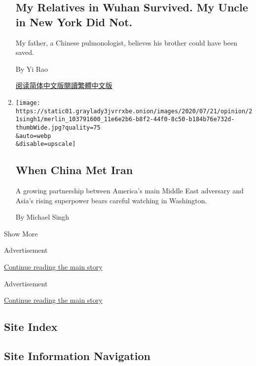 \begin{enumerate}
{  \subsection{My Relatives in Wuhan Survived. My Uncle in New York Did
  Not.}\label{my-relatives-in-wuhan-survived-my-uncle-in-new-york-did-not}}

  My father, a Chinese pulmonologist, believes his brother could have
  been saved.

  By Yi Rao

  \href{https://cn.nytimes3xbfgragh.onion/opinion/20200723/coronavirus-china-us/}{阅读简体中文版}\href{https://cn.nytimes3xbfgragh.onion/opinion/20200723/coronavirus-china-us/zh-hant/}{閱讀繁體中文版}
\item
  \href{/2020/07/21/opinion/china-iran.html}{}

  \texttt{[image: https://static01.graylady3jvrrxbe.onion/images/2020/07/21/opinion/21singh1/merlin\_103791600\_11e6e2b6-b8f2-44f0-8c50-b184b76e732d-thumbWide.jpg?quality=75\\\&auto=webp\\\&disable=upscale]}

  \hypertarget{when-china-met-iran}{%
  \subsection{When China Met Iran}\label{when-china-met-iran}}

  A growing partnership between America's main Middle East adversary and
  Asia's rising superpower bears careful watching in Washington.

  By Michael Singh
\end{enumerate}

Show More

Advertisement

\protect\hyperlink{after-mid1}{Continue reading the main story}

Advertisement

\protect\hyperlink{after-mktg}{Continue reading the main story}

\hypertarget{site-index}{%
\subsection{Site Index}\label{site-index}}

\hypertarget{site-information-navigation}{%
\subsection{Site Information
Navigation}\label{site-information-navigation}}

